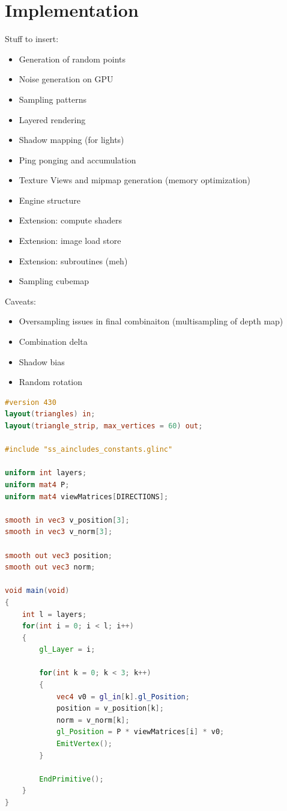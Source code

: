 \chapter{Implementation}

Stuff to insert:
\begin{itemize}
	\item Generation of random points
	\item Noise generation on GPU
	\item Sampling patterns
	\item Layered rendering
	\item Shadow mapping (for lights)
	\item Ping ponging and accumulation
	\item Texture Views and mipmap generation (memory optimization)
	\item Engine structure
	\item Extension: compute shaders
	\item Extension: image load store
	\item Extension: subroutines (meh)
	\item Sampling cubemap

\end{itemize}

Caveats:
\begin{itemize}
	\item Oversampling issues in final combinaiton (multisampling of depth map)
	\item Combination delta
	\item Shadow bias
  \item Random rotation
	
\end{itemize}

\begin{lstlisting}[language=GLSL,label=test,caption=Test!]
#version 430
layout(triangles) in;
layout(triangle_strip, max_vertices = 60) out;

#include "ss_aincludes_constants.glinc"

uniform int layers;
uniform mat4 P;
uniform mat4 viewMatrices[DIRECTIONS];

smooth in vec3 v_position[3];
smooth in vec3 v_norm[3];

smooth out vec3 position;
smooth out vec3 norm;

void main(void)
{
    int l = layers;
    for(int i = 0; i < l; i++)
    {
        gl_Layer = i;

        for(int k = 0; k < 3; k++)
        {
            vec4 v0 = gl_in[k].gl_Position;
            position = v_position[k];
            norm = v_norm[k];
            gl_Position = P * viewMatrices[i] * v0;
            EmitVertex();
        }

        EndPrimitive();
    }
}
\end{lstlisting}

